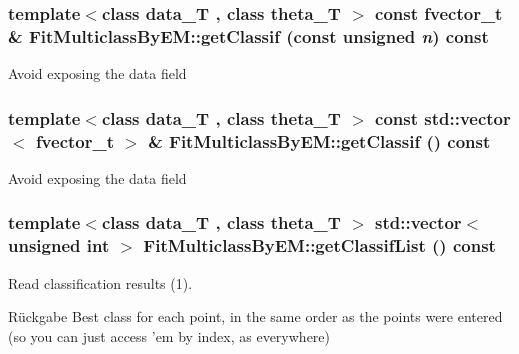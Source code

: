 \hypertarget{classCDA_1_1FitMulticlassByEM_addcc14007ec1f00046391c3ac7572e34}{
\subsubsection[{getClassif}]{\setlength{\rightskip}{0pt plus 5cm}template$<$class data\_\-T , class theta\_\-T $>$ const fvector\_\-t \& FitMulticlassByEM::getClassif (const unsigned {\em n}) const}}
\label{classCDA_1_1FitMulticlassByEM_addcc14007ec1f00046391c3ac7572e34}
Avoid exposing the data field \hypertarget{classCDA_1_1FitMulticlassByEM_ad468afb0c45474a7400fd7efbb1ad2dd}{
\subsubsection[{getClassif}]{\setlength{\rightskip}{0pt plus 5cm}template$<$class data\_\-T , class theta\_\-T $>$ const std::vector$<$ fvector\_\-t $>$ \& FitMulticlassByEM::getClassif () const}}
\label{classCDA_1_1FitMulticlassByEM_ad468afb0c45474a7400fd7efbb1ad2dd}
Avoid exposing the data field \hypertarget{classCDA_1_1FitMulticlassByEM_a915e6a0aaae5f74c5802b53fbed8278a}{
\subsubsection[{getClassifList}]{\setlength{\rightskip}{0pt plus 5cm}template$<$class data\_\-T , class theta\_\-T $>$ std::vector$<$ unsigned int $>$ FitMulticlassByEM::getClassifList () const}}
\label{classCDA_1_1FitMulticlassByEM_a915e6a0aaae5f74c5802b53fbed8278a}


Read classification results (1). 

\begin{DoxyReturn}{Rückgabe}
Best class for each point, in the same order as the points were entered (so you can just access 'em by index, as everywhere) 
\end{DoxyReturn}


